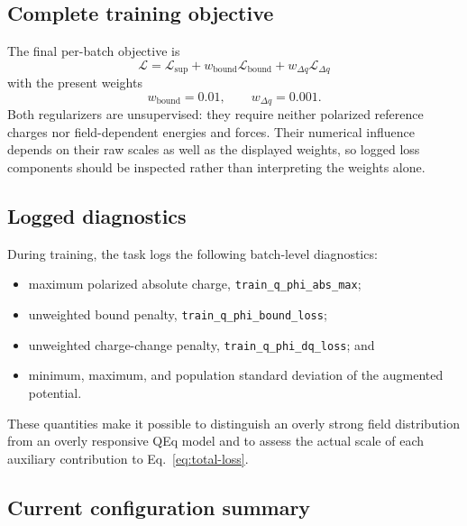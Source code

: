 \documentclass[11pt,a4paper]{article}
\begin{document}
\subsection{Complete training objective}

The final per-batch objective is
\begin{equation}
  \boxed{
  \mathcal L
  =\mathcal L_{\mathrm{sup}}
  +w_{\mathrm{bound}}\mathcal L_{\mathrm{bound}}
  +w_{\Delta q}\mathcal L_{\Delta q}}
  \label{eq:total-loss}
\end{equation}
with the present weights
\begin{equation}
  w_{\mathrm{bound}}=0.01,
  \qquad
  w_{\Delta q}=0.001.
\end{equation}
Both regularizers are unsupervised: they require neither polarized reference
charges nor field-dependent energies and forces.  Their numerical influence
depends on their raw scales as well as the displayed weights, so logged loss
components should be inspected rather than interpreting the weights alone.

\subsection{Logged diagnostics}

During training, the task logs the following batch-level diagnostics:
\begin{itemize}
  \item maximum polarized absolute charge,
        \texttt{train\_q\_phi\_abs\_max};
  \item unweighted bound penalty,
        \texttt{train\_q\_phi\_bound\_loss};
  \item unweighted charge-change penalty,
        \texttt{train\_q\_phi\_dq\_loss}; and
  \item minimum, maximum, and population standard deviation of the augmented
        potential.
\end{itemize}
These quantities make it possible to distinguish an overly strong field
distribution from an overly responsive QEq model and to assess the actual scale
of each auxiliary contribution to Eq.~\eqref{eq:total-loss}.

\subsection{Current configuration summary}
\end{document}
